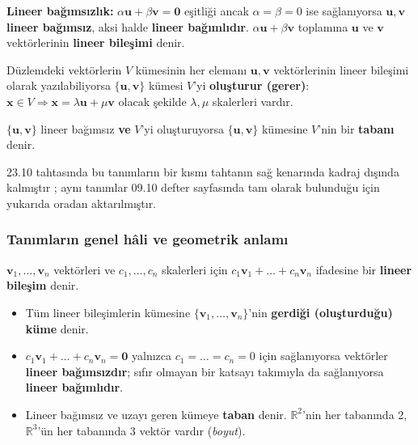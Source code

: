 \begin{tahta}
\textbf{Lineer bağımsızlık:} $\alpha\mathbf u+\beta\mathbf v=\mathbf 0$ eşitliği ancak $\alpha=\beta=0$ ise sağlanıyorsa $\mathbf u,\mathbf v$ \textbf{lineer bağımsız}, aksi halde \textbf{lineer bağımlıdır}. $\alpha\mathbf u+\beta\mathbf v$ toplamına $\mathbf u$ ve $\mathbf v$ vektörlerinin \textbf{lineer bileşimi} denir.

Düzlemdeki vektörlerin $V$ kümesinin her elemanı $\mathbf u,\mathbf v$ vektörlerinin lineer bileşimi olarak yazılabiliyorsa $\{\mathbf u,\mathbf v\}$ kümesi $V$'yi \textbf{oluşturur (gerer)}: $\mathbf x\in V\Rightarrow\mathbf x=\lambda\mathbf u+\mu\mathbf v$ olacak şekilde $\lambda,\mu$ skalerleri vardır.

$\{\mathbf u,\mathbf v\}$ lineer bağımsız \textbf{ve} $V$'yi oluşturuyorsa $\{\mathbf u,\mathbf v\}$ kümesine $V$'nin bir \textbf{tabanı} denir.
\end{tahta}

\begin{bilgi}
23.10 tahtasında bu tanımların bir kısmı tahtanın sağ kenarında kadraj dışında kalmıştır ; aynı tanımlar 09.10 defter sayfasında  tam olarak bulunduğu için yukarıda oradan aktarılmıştır.
\end{bilgi}

\subsubsection{Tanımların genel hâli ve geometrik anlamı}

\begin{tanim}
$\mathbf v_1,\dots,\mathbf v_n$ vektörleri ve $c_1,\dots,c_n$ skalerleri için $c_1\mathbf v_1+\dots+c_n\mathbf v_n$ ifadesine bir \textbf{lineer bileşim} denir.
\begin{itemize}
\item Tüm lineer bileşimlerin kümesine $\{\mathbf v_1,\dots,\mathbf v_n\}$'nin \textbf{gerdiği (oluşturduğu) küme} denir.
\item $c_1\mathbf v_1+\dots+c_n\mathbf v_n=\mathbf 0$ yalnızca $c_1=\dots=c_n=0$ için sağlanıyorsa vektörler \textbf{lineer bağımsızdır}; sıfır olmayan bir katsayı takımıyla da sağlanıyorsa \textbf{lineer bağımlıdır}.
\item Lineer bağımsız ve uzayı geren kümeye \textbf{taban} denir. $\mathbb R^2$'nin her tabanında 2, $\mathbb R^3$'ün her tabanında 3 vektör vardır (\emph{boyut}).
\end{itemize}
\end{tanim}

